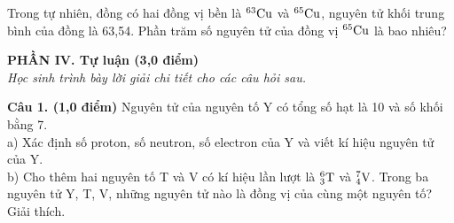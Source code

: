 \documentclass[11pt,a4paper]{article}
\begin{document}
\begin{ex}
Trong tự nhiên, đồng có hai đồng vị bền là $^{63}\ce{Cu}$ và $^{65}\ce{Cu}$, nguyên tử khối trung bình của đồng là 63,54. Phần trăm số nguyên tử của đồng vị $^{65}\ce{Cu}$ là bao nhiêu?

\end{ex}
\vspace{6pt}
\noindent
{\color{mainGreen}\textbf{\large PHẦN IV. Tự luận (3,0 điểm)}}\\
\textit{\small Học sinh trình bày lời giải chi tiết cho các câu hỏi sau.}
\vspace{2pt}

\noindent
\textbf{Câu 1. (1,0 điểm)} Nguyên tử của nguyên tố Y có tổng số hạt là 10 và số khối bằng 7.\\
a) Xác định số proton, số neutron, số electron của Y và viết kí hiệu nguyên tử của Y.\\
b) Cho thêm hai nguyên tố T và V có kí hiệu lần lượt là $^{6}_{3}\ce{T}$ và $^{7}_{4}\ce{V}$. Trong ba nguyên tử Y, T, V, những nguyên tử nào là đồng vị của cùng một nguyên tố? Giải thích.
\end{document}
